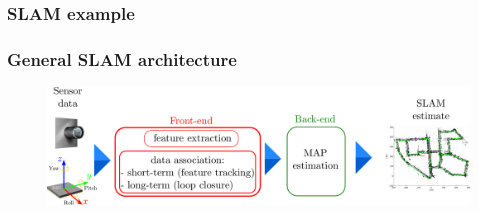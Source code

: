     \begin{frame}
     \frametitle{SLAM example}
    
     \begin{figure}
     \hfill{}
     \end{figure}
    
    \end{frame}
    
    \begin{frame}
     \frametitle{General SLAM architecture}
    
     \begin{figure}[!h]
     \includegraphics[width=\textwidth]{images/slam_frontend_backend.pdf}
     \end{figure}
    
\end{frame}

